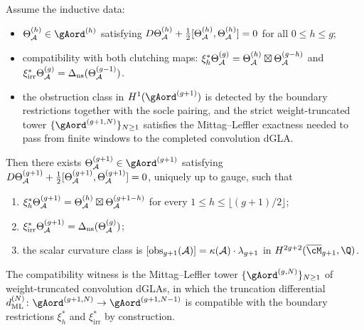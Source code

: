 \begin{theorem}
\label{thm:theta-A-induction}
Assume the inductive data:
\begin{itemize}
\item $\Theta_\cA^{(h)}\in{\gAord}^{(h)}$ satisfying
$D\Theta_{\mathcal{A}}^{(h)}+\tfrac{1}{2}[\Theta_{\mathcal{A}}^{(h)},\Theta_{\mathcal{A}}^{(h)}]=0$
for all $0\leq h\leq g$;
\item compatibility with both clutching maps:
$\xi_{h}^{*}\Theta_{\mathcal{A}}^{(g)}=\Theta_{\mathcal{A}}^{(h)}\boxtimes
\Theta_{\mathcal{A}}^{(g-h)}$ and $\xi_{\mathrm{irr}}^{*}\Theta_{\mathcal{A}}^{(g)}=
\Delta_{\mathrm{ns}}(\Theta_{\mathcal{A}}^{(g-1)})$.
\item the obstruction class in
$H^{1}({\gAord}^{(g+1)})$ is detected by the boundary restrictions
together with the socle pairing, and the strict weight-truncated tower
$\{{\gAord}^{(g+1,N)}\}_{N\geq 1}$ satisfies the Mittag--Leffler
exactness needed to pass from finite windows to the completed
convolution dGLA.
\end{itemize}
Then there exists $\Theta_\cA^{(g+1)}\in{\gAord}^{(g+1)}$ satisfying
$D\Theta_{\mathcal{A}}^{(g+1)}+\tfrac{1}{2}[\Theta_{\mathcal{A}}^{(g+1)},
\Theta_{\mathcal{A}}^{(g+1)}]=0$, uniquely up to gauge, such that
\begin{enumerate}[label=\textup{(\roman*)}]
\item $\xi_{h}^{*}\Theta_{\mathcal{A}}^{(g+1)}
=\Theta_{\mathcal{A}}^{(h)}\boxtimes\Theta_{\mathcal{A}}^{(g+1-h)}$ for every
$1\leq h\leq\lfloor(g+1)/2\rfloor$;
\item $\xi_{\mathrm{irr}}^{*}\Theta_{\mathcal{A}}^{(g+1)}=
\Delta_{\mathrm{ns}}(\Theta_{\mathcal{A}}^{(g)})$;
\item the scalar curvature class is
$[\mathrm{obs}_{g+1}(\mathcal{A})]=\kappa(\mathcal{A})\cdot\lambda_{g+1}$
in $H^{2g+2}(\overline{\cM}_{g+1},\Q)$.
\end{enumerate}
The compatibility witness is the Mittag--Leffler tower
$\{{\gAord}^{(g,N)}\}_{N\geq 1}$ of weight-truncated convolution
dGLAs, in which the truncation differential
$d_{\mathrm{ML}}^{(N)}\colon{\gAord}^{(g+1,N)}\to{\gAord}^{(g+1,N-1)}$
is compatible with the boundary restrictions $\xi_{h}^{*}$ and
$\xi_{\mathrm{irr}}^{*}$ by construction.
\end{theorem}

